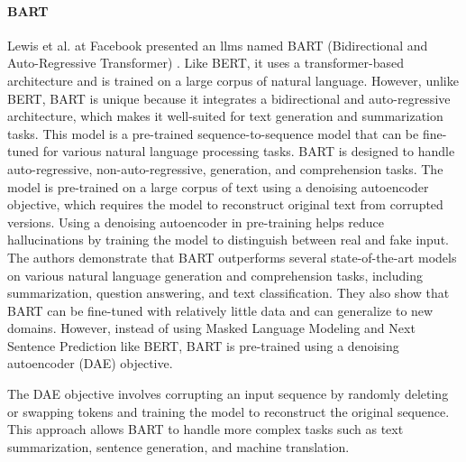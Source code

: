     
    
    \paragraph{BART\\}
    Lewis et al. at Facebook presented an \glspl{llm} named BART (Bidirectional and Auto-Regressive Transformer) \cite{lewisBARTDenoisingSequencetoSequence2019}. Like BERT, it uses a transformer-based architecture and is trained on a large corpus of natural language. However, unlike BERT, BART is unique because it integrates a bidirectional and auto-regressive architecture, which makes it well-suited for text generation and summarization tasks. 
    This model is a pre-trained sequence-to-sequence model that can be fine-tuned for various natural language processing tasks. BART is designed to handle auto-regressive, non-auto-regressive, generation, and comprehension tasks. The model is pre-trained on a large corpus of text using a denoising autoencoder objective, which requires the model to reconstruct original text from corrupted versions. Using a denoising autoencoder in pre-training helps reduce hallucinations by training the model to distinguish between real and fake input. 
    The authors demonstrate that BART outperforms several state-of-the-art models on various natural language generation and comprehension tasks, including summarization, question answering, and text classification. They also show that BART can be fine-tuned with relatively little data and can generalize to new domains. 
    However, instead of using Masked Language Modeling and Next Sentence Prediction like BERT, BART is pre-trained using a denoising autoencoder (DAE) objective.

    The DAE objective involves corrupting an input sequence by randomly deleting or swapping tokens and training the model to reconstruct the original sequence. This approach allows BART to handle more complex tasks such as text summarization, sentence generation, and machine translation.
        
    
    

